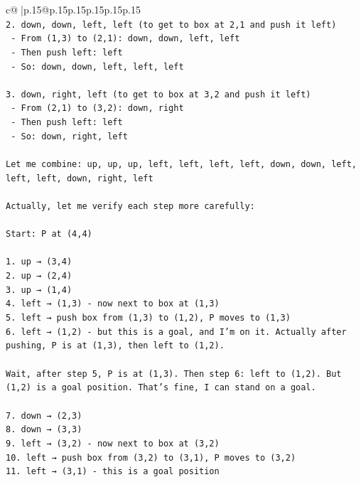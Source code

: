 \documentclass{article}
\begin{document}
{\begin{supertabular}{c@{$\;$}|p{.15\linewidth}@{}p{.15\linewidth}p{.15\linewidth}p{.15\linewidth}p{.15\linewidth}p{.15\linewidth}}
{{{\\ 
\texttt{2. down, down, left, left (to get to box at 2,1 and push it left)} \\
\texttt{   {-} From (1,3) to (2,1): down, down, left, left} \\
\texttt{   {-} Then push left: left} \\
\texttt{   {-} So: down, down, left, left, left} \\
\\ 
\texttt{3. down, right, left (to get to box at 3,2 and push it left)} \\
\texttt{   {-} From (2,1) to (3,2): down, right} \\
\texttt{   {-} Then push left: left} \\
\texttt{   {-} So: down, right, left} \\
\\ 
\texttt{Let me combine: up, up, up, left, left, left, left, down, down, left, left, left, down, right, left} \\
\\ 
\texttt{Actually, let me verify each step more carefully:} \\
\\ 
\texttt{Start: P at (4,4)} \\
\\ 
\texttt{1. up → (3,4)} \\
\texttt{2. up → (2,4)} \\
\texttt{3. up → (1,4)} \\
\texttt{4. left → (1,3) {-} now next to box at (1,3)} \\
\texttt{5. left → push box from (1,3) to (1,2), P moves to (1,3)} \\
\texttt{6. left → (1,2) {-} but this is a goal, and I'm on it. Actually after pushing, P is at (1,3), then left to (1,2).} \\
\\ 
\texttt{Wait, after step 5, P is at (1,3). Then step 6: left to (1,2). But (1,2) is a goal position. That's fine, I can stand on a goal.} \\
\\ 
\texttt{7. down → (2,3)} \\
\texttt{8. down → (3,3)} \\
\texttt{9. left → (3,2) {-} now next to box at (3,2)} \\
\texttt{10. left → push box from (3,2) to (3,1), P moves to (3,2)} \\
\texttt{11. left → (3,1) {-} this is a goal position} \\
}}}
\end{supertabular}}
\end{document}
